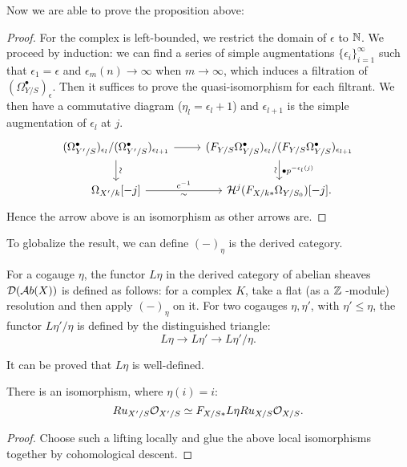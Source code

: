 Now we are able to prove the proposition above:
\begin{proof}
    For the complex is left-bounded, 
    we restrict the domain of $\epsilon$ to ${\mathbb {N}}$. 
    We proceed by induction: 
    we can find a series of simple augmentations $\{\epsilon_i\}_{i=1}^{\infty}$ 
    such that $\epsilon_1=\epsilon$ and $\epsilon_m(n)\to \infty$ when $m\to \infty$, 
    which induces a filtration of $(\Omega_{Y/S}^\bullet)_\epsilon$. 
    Then it suffices to prove the quasi-isomorphism for each filtrant. 
    We then have a commutative diagram ($\eta_l=\epsilon_l+1$) 
    and $\epsilon_{l+1}$ is the simple augmentation of $\epsilon_l$ at $j$.
    \[
        \begin{tikzcd}
            (\Omega_{Y'/S}^\bullet)_{\epsilon_l} / (\Omega_{Y'/S}^\bullet)_{\epsilon_{l + 1}} 
            \ar[r] \ar[d, "\sim"sloped]
            & (F_{Y/S} \Omega_{Y/S}^\bullet)_{\epsilon_l} / 
            (F_{Y/S} \Omega_{Y/S}^\bullet)_{\epsilon_{l+1}} 
            \dar[] {\bullet p^{-\epsilon_l(j)}}[sloped, swap] {\sim} \\
            \Omega_{X'/k}[-j] \ar[r, "c^{-1}", "\sim"swap] & 
            \CH^j (F_{X/k*} \Omega_{Y/S_0}) [-j].
        \end{tikzcd}
    \]
Hence the arrow above is an isomorphism as other arrows are.
\end{proof}

To globalize the result, we can define $(-)_\eta$ is the derived category.
\begin{definition}
    For a cogauge $\eta$, the functor $L \eta$ 
    in the derived category of abelian sheaves ${\mathcal {D}}({\mathcal {A}} b(X))$ 
    is defined as follows: for a complex $K$, 
    take a flat (as a ${\mathbb {Z}}$ -module) resolution and then 
    apply $(-)_\eta$ on it. 
    For two cogauges $\eta, \eta'$, with $\eta' \leq \eta$, 
    the functor $L\eta'/\eta$ is defined by the distinguished triangle:
    \[
        L\eta \to L \eta' \to L \eta'/\eta.
    \]
\end{definition}

It can be proved that $L\eta$ is well-defined.
\begin{theorem}
    There is an isomorphism, where $\eta(i)=i$:
    \[
        Ru_{X'/S} {\mathcal {O}}_{X'/S} \simeq F_{X/S*}L \eta Ru_{X/S} {\mathcal {O}}_{X/S}.
    \]
\end{theorem}

\begin{proof}
    Choose such a lifting locally and 
    glue the above local isomorphisms together by cohomological descent. 
\end{proof}

